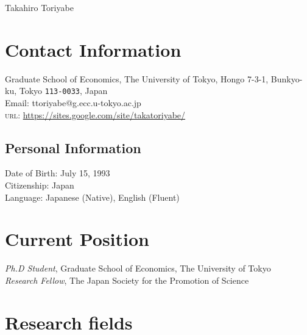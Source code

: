 \documentclass[11pt, a4paper]{article} %
\begin{document}

{\LARGE Takahiro Toriyabe}\\[1cm] %

\section*{Contact Information}
Graduate School of Economics, The University of Tokyo, Hongo 7-3-1, Bunkyo-ku, Tokyo \texttt{113-0033}, Japan\\
Email: ttoriyabe@g.ecc.u-tokyo.ac.jp\\ %
\textsc{url}: \url{https://sites.google.com/site/takatoriyabe/}\\ %



\subsection*{Personal Information}

Date of Birth: July 15, 1993\\ %
Citizenship: Japan\\ %
Language: Japanese (Native), English (Fluent)


\section*{Current Position}

\emph{Ph.D Student}, Graduate School of Economics, The University of Tokyo\\
\emph{Research Fellow}, The Japan Society for the Promotion of Science


\section*{Research fields}
\end{document}
